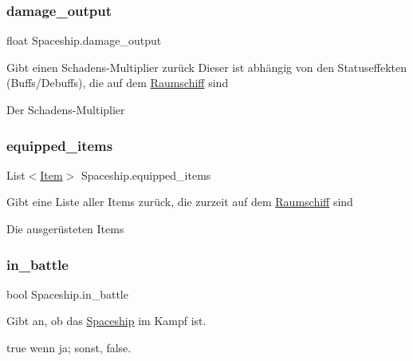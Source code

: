 \subsubsection{\texorpdfstring{damage\+\_\+output}{damage\_output}}
{\footnotesize\ttfamily float Spaceship.\+damage\+\_\+output\hspace{0.3cm}{\ttfamily [get]}}



Gibt einen Schadens-\/\+Multiplier zurück Dieser ist abhängig von den Statuseffekten (Buffs/\+Debuffs), die auf dem \hyperlink{class_raumschiff}{Raumschiff} sind 

Der Schadens-\/\+Multiplier\mbox{\label{class_spaceship_a89158e2a2dc71a98acb3c3755962c144}} 
\subsubsection{\texorpdfstring{equipped\+\_\+items}{equipped\_items}}
{\footnotesize\ttfamily List$<$\hyperlink{class_item}{Item}$>$ Spaceship.\+equipped\+\_\+items\hspace{0.3cm}{\ttfamily [get]}}



Gibt eine Liste aller Items zurück, die zurzeit auf dem \hyperlink{class_raumschiff}{Raumschiff} sind 

Die ausgerüsteten Items\mbox{\label{class_spaceship_a008e4fcc8af1c4ebbaee64603593d6d1}} 
\subsubsection{\texorpdfstring{in\+\_\+battle}{in\_battle}}
{\footnotesize\ttfamily bool Spaceship.\+in\+\_\+battle\hspace{0.3cm}{\ttfamily [get]}}



Gibt an, ob das \hyperlink{class_spaceship}{Spaceship} im Kampf ist. 

{\ttfamily true} wenn ja; sonst, {\ttfamily false}.\mbox{\label{class_spaceship_a9dfc7adf86ae18216d0244326e7a6ebf}} 
